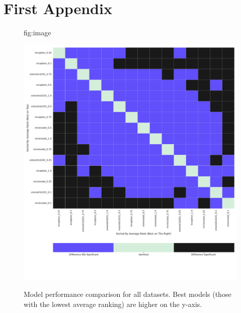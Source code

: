 \documentclass[pmlr,twocolumn]{jmlr}%
\begin{document}
\section{First Appendix}\label{apd:model_vs_model}
\begin{figure}[tbp]
\floatconts
  {fig:image}
  {\caption{Model performance comparison for all datasets. Best models (those with the lowest average ranking) are higher on the y-axis.}}
  {\includegraphics[width=1\linewidth]{images/model_comparisons_alldatasets.pdf}}
 
\end{figure}
\end{document}
